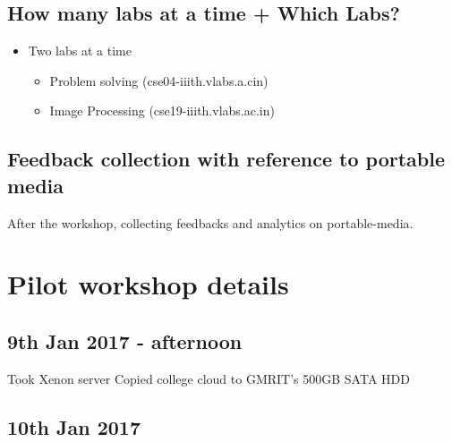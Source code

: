 \documentclass[11pt]{article}
\begin{document}
\subsection{How many labs at a time + Which Labs?}
\label{sec-2-5}
\begin{itemize}
\item Two labs at a time 
\begin{itemize}
\item Problem solving (cse04-iiith.vlabs.a.cin)
\item Image Processing (cse19-iiith.vlabs.ac.in)
\end{itemize}
\end{itemize}
\subsection{Feedback collection with reference to portable media}
\label{sec-2-6}
After the workshop, collecting feedbacks and analytics on
portable-media.

\section{Pilot workshop details}
\label{sec-3}
\subsection{9th Jan 2017 - afternoon}
\label{sec-3-1}
Took Xenon server 
Copied college cloud to GMRIT's 500GB SATA HDD
\subsection{10th Jan 2017}
\label{sec-3-2}
\end{document}
